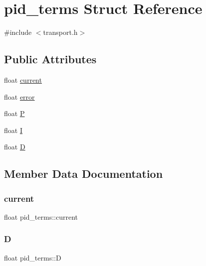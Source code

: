 \hypertarget{structpid__terms}{}\section{pid\+\_\+terms Struct Reference}
\label{structpid__terms}


{\ttfamily \#include $<$transport.\+h$>$}

\subsection*{Public Attributes}
\begin{DoxyCompactItemize}
\item 
float \hyperlink{structpid__terms_ab4c7f8712a43d4fe1b8932783f286c22}{current}
\item 
float \hyperlink{structpid__terms_a8073092d43a680432fa0f7784a7aef29}{error}
\item 
float \hyperlink{structpid__terms_af930983320efcf1d96d3b7cb85fee908}{P}
\item 
float \hyperlink{structpid__terms_af72ae69eaa9faeab7273dcbd847fdee9}{I}
\item 
float \hyperlink{structpid__terms_a864b7035292cd484f321d0f52a5a68d8}{D}
\end{DoxyCompactItemize}


\subsection{Member Data Documentation}
\mbox{\label{structpid__terms_ab4c7f8712a43d4fe1b8932783f286c22}} 
\subsubsection{\texorpdfstring{current}{current}}
{\footnotesize\ttfamily float pid\+\_\+terms\+::current}

\mbox{\label{structpid__terms_a864b7035292cd484f321d0f52a5a68d8}} 
\subsubsection{\texorpdfstring{D}{D}}
{\footnotesize\ttfamily float pid\+\_\+terms\+::D}

